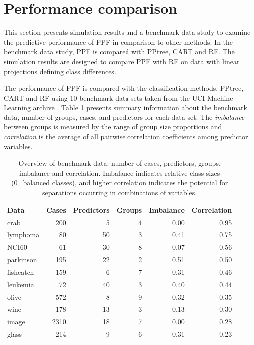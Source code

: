 \documentclass[12pt]{article}\usepackage[]{graphicx}\usepackage[]{color}
\begin{document}
\section{Performance comparison}\label{perfsec} 

This section presents simulation results and a benchmark data study to examine the predictive performance of PPF in comparison to other methods. In the benchmark data study, PPF is compared with PPtree, CART and RF. The simulation results are designed to compare PPF with RF on data with linear projections defining class differences.

The performance of PPF is compared with the classification methods, PPtree, CART and RF using 10 benchmark data sets taken from the UCI Machine Learning archive \citep{Lichman}. Table \ref{bench.tab} presents summary information about the benchmark data, number of groups, cases, and predictors for each data set. The \textit{imbalance} between groups is measured by the range of group size proportions and \textit{correlation} is the average of all pairwise correlation coefficients among predictor variables.

\begin{table}[ht]
\centering
\caption{Overview of benchmark data: number of cases, predictors, groups, imbalance and correlation. Imbalance indicates relative class sizes (0=balanced classes), and higher correlation indicates the potential for separations occurring in combinations of variables.} 
\label{bench.tab}
\begin{tabular}{lrrrrr}
  \hline
Data & Cases & Predictors & Groups & Imbalance & Correlation \\ 
  \hline
crab & 200 &   5 &   4 & 0.00 & 0.95 \\ 
  lymphoma &  80 &  50 &   3 & 0.41 & 0.75 \\ 
  NCI60 &  61 &  30 &   8 & 0.07 & 0.56 \\ 
  parkinson & 195 &  22 &   2 & 0.51 & 0.50 \\ 
  fishcatch & 159 &   6 &   7 & 0.31 & 0.46 \\ 
  leukemia &  72 &  40 &   3 & 0.40 & 0.44 \\ 
  olive & 572 &   8 &   9 & 0.32 & 0.35 \\ 
  wine & 178 &  13 &   3 & 0.13 & 0.30 \\ 
  image & 2310 &  18 &   7 & 0.00 & 0.28 \\ 
  glass & 214 &   9 &   6 & 0.31 & 0.23 \\ 
   \hline
\end{tabular}
\end{table}
\end{document}
